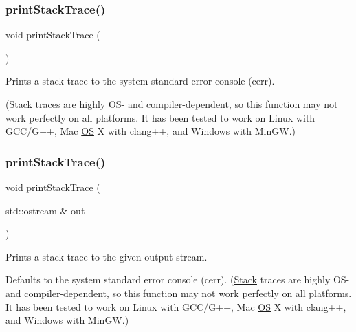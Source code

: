 \subsubsection{\texorpdfstring{print\+Stack\+Trace()}{printStackTrace()}\hspace{0.1cm}{\footnotesize\ttfamily [1/2]}}
{\footnotesize\ttfamily void print\+Stack\+Trace (\begin{DoxyParamCaption}{ }\end{DoxyParamCaption})}



Prints a stack trace to the system standard error console (cerr). 

(\mbox{\hyperlink{classStack}{Stack}} traces are highly O\+S-\/ and compiler-\/dependent, so this function may not work perfectly on all platforms. It has been tested to work on Linux with G\+C\+C/\+G++, Mac \mbox{\hyperlink{classOS}{OS}} X with clang++, and Windows with Min\+GW.) \mbox{\label{namespaceexceptions_af5ab86e2f23863043ddcdaf18b8b9f28}} 
\subsubsection{\texorpdfstring{print\+Stack\+Trace()}{printStackTrace()}\hspace{0.1cm}{\footnotesize\ttfamily [2/2]}}
{\footnotesize\ttfamily void print\+Stack\+Trace (\begin{DoxyParamCaption}\item[{std\+::ostream \&}]{out }\end{DoxyParamCaption})}



Prints a stack trace to the given output stream. 

Defaults to the system standard error console (cerr). (\mbox{\hyperlink{classStack}{Stack}} traces are highly O\+S-\/ and compiler-\/dependent, so this function may not work perfectly on all platforms. It has been tested to work on Linux with G\+C\+C/\+G++, Mac \mbox{\hyperlink{classOS}{OS}} X with clang++, and Windows with Min\+GW.) \mbox{\label{namespaceexceptions_ad0e98551ca679408334da24bdf4e4584}} 

